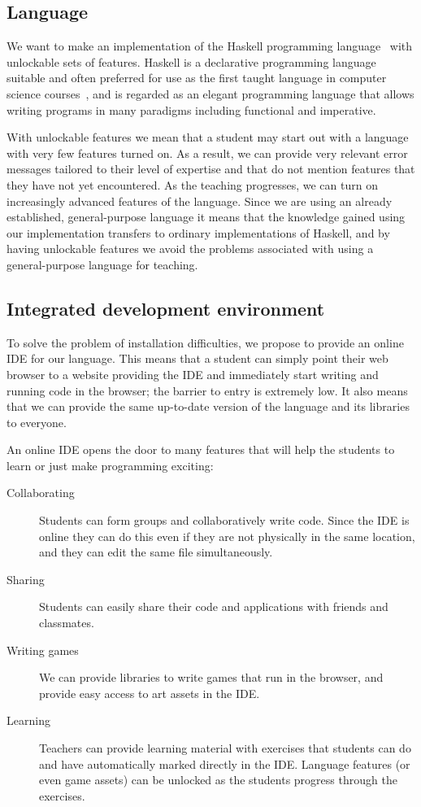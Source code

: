 \subsection{Language} \label{sec:Language}

We want to make an implementation of the Haskell programming
language~\cite{marlow2010haskell} with unlockable sets of features.  Haskell is
a declarative programming language suitable and often preferred for use as the
first taught language in computer science courses~\cite{dijkstra2001members},
and is regarded as an elegant programming language that allows writing programs
in many paradigms including functional and imperative.

With unlockable features we mean that a student may start out with a language
with very few features turned on. As a result, we can provide very relevant
error messages tailored to their level of expertise and that do not mention
features that they have not yet encountered. As the teaching progresses, we can
turn on increasingly advanced features of the language.  Since we are using an
already established, general-purpose language it means that the knowledge
gained using our implementation transfers to ordinary implementations of
Haskell, and by having unlockable features we avoid the problems associated
with using a general-purpose language for teaching.

\subsection{Integrated development environment} \label{sec:IDE}

To solve the problem of installation difficulties, we propose to provide an
online IDE for our language.  This means that a student can simply point their
web browser to a website providing the IDE and immediately start writing and
running code in the browser; the barrier to entry is extremely low. It also
means that we can provide the same up-to-date version of the language and its
libraries to everyone.

An online IDE opens the door to many features that will help the students to
learn or just make programming exciting:
\begin{description}
  \item[Collaborating]
    Students can form groups and collaboratively write code.  Since the IDE is
    online they can do this even if they are not physically in the same
    location, and they can edit the same file simultaneously.
  \item[Sharing]
    Students can easily share their code and applications with friends and
    classmates.
  \item[Writing games] 
    We can provide libraries to write games that run in the browser, and
    provide easy access to art assets in the IDE.
  \item[Learning]
    Teachers can provide learning material with exercises that students can do
    and have automatically marked directly in the IDE. Language features (or
    even game assets) can be unlocked as the students progress through the
    exercises.
\end{description}


